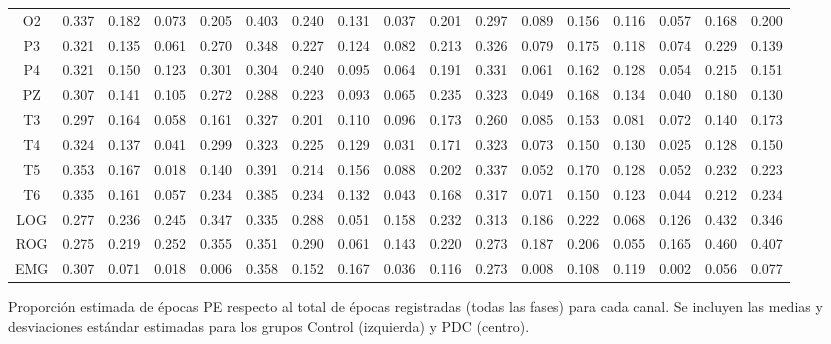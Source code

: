 \begin{SidewaysFigure}
\begin{tabular}{c||ccccc|cc||cccc|cc||ccc}
 O2 & 0.337    & 0.182    & 0.073    & 0.205    & 0.403    & 0.240    & 0.131    & 0.037    & 0.201    & 0.297    & 0.089    & 0.156    & 0.116    & 0.057    & 0.168    & 0.200     \\
 P3 & 0.321    & 0.135    & 0.061    & 0.270    & 0.348    & 0.227    & 0.124    & 0.082    & 0.213    & 0.326    & 0.079    & 0.175    & 0.118    & 0.074    & 0.229    & 0.139     \\
 P4 & 0.321    & 0.150    & 0.123    & 0.301    & 0.304    & 0.240    & 0.095    & 0.064    & 0.191    & 0.331    & 0.061    & 0.162    & 0.128    & 0.054    & 0.215    & 0.151     \\
 PZ & 0.307    & 0.141    & 0.105    & 0.272    & 0.288    & 0.223    & 0.093    & 0.065    & 0.235    & 0.323    & 0.049    & 0.168    & 0.134    & 0.040    & 0.180    & 0.130     \\
 T3 & 0.297    & 0.164    & 0.058    & 0.161    & 0.327    & 0.201    & 0.110    & 0.096    & 0.173    & 0.260    & 0.085    & 0.153    & 0.081    & 0.072    & 0.140    & 0.173     \\
 T4 & 0.324    & 0.137    & 0.041    & 0.299    & 0.323    & 0.225    & 0.129    & 0.031    & 0.171    & 0.323    & 0.073    & 0.150    & 0.130    & 0.025    & 0.128    & 0.150     \\
 T5 & 0.353    & 0.167    & 0.018    & 0.140    & 0.391    & 0.214    & 0.156    & 0.088    & 0.202    & 0.337    & 0.052    & 0.170    & 0.128    & 0.052    & 0.232    & 0.223     \\
 T6 & 0.335    & 0.161    & 0.057    & 0.234    & 0.385    & 0.234    & 0.132    & 0.043    & 0.168    & 0.317    & 0.071    & 0.150    & 0.123    & 0.044    & 0.212    & 0.234     \\
 LOG & 0.277    & 0.236    & 0.245    & 0.347    & 0.335    & 0.288    & 0.051    & 0.158    & 0.232    & 0.313    & 0.186    & 0.222    & 0.068    & 0.126    & 0.432    & 0.346     \\
 ROG & 0.275    & 0.219    & 0.252    & 0.355    & 0.351    & 0.290    & 0.061    & 0.143    & 0.220    & 0.273    & 0.187    & 0.206    & 0.055    & 0.165    & 0.460    & 0.407     \\
 EMG & 0.307    & 0.071    & 0.018    & 0.006    & 0.358    & 0.152    & 0.167    & 0.036    & 0.116    & 0.273    & 0.008    & 0.108    & 0.119    & 0.002    & 0.056    & 0.077    
\end{tabular}
\caption{Proporci\'on estimada de \'epocas PE respecto al total de \'epocas registradas
(todas las fases) para cada
canal. Se incluyen las medias y desviaciones est\'andar estimadas para los grupos 
Control (izquierda) y PDC (centro).}
\label{gpos_total}
\end{SidewaysFigure}

